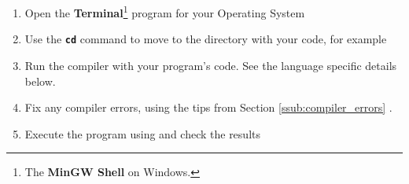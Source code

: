 \begin{enumerate}
  \item Open the \textbf{Terminal}\footnote{The \textbf{MinGW Shell} on Windows.} program for your Operating System
  \item Use the \texttt{\textbf{cd}} command to move to the directory with your code, for example \newline {}
  \item Run the compiler with your program's code. See the language specific details below.
  \item Fix any compiler errors, using the tips from Section \ref{ssub:compiler_errors} .
  \item Execute the program using  and check the results
\end{enumerate}







